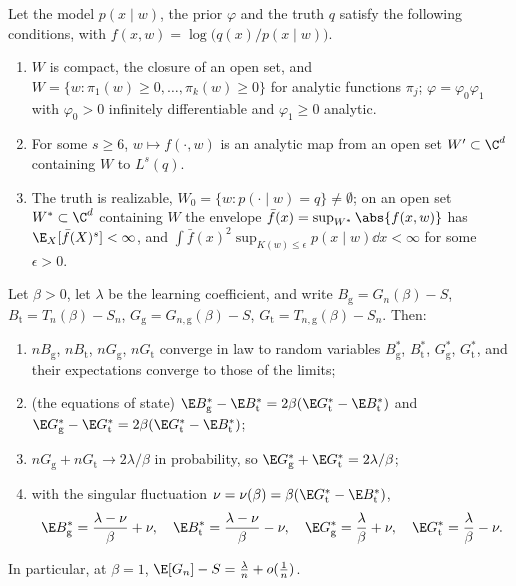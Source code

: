 \begin{refsection}
\begin{theorem}\label{thm:generalization:main}
Let the model $p(x\mid w)$, the prior $\varphi$ and the truth $q$ satisfy the following conditions, with $f(x,w)=\log\bigl(q(x)/p(x\mid w)\bigr)$.
\begin{enumerate}[label=(\roman*),nosep]
\item $W$ is compact, the closure of an open set, and $W=\{w:\pi_1(w)\ge0,\dots,\pi_k(w)\ge0\}$ for analytic functions $\pi_j$; $\varphi=\varphi_0\varphi_1$ with $\varphi_0>0$ infinitely differentiable and $\varphi_1\ge0$ analytic.
\item For some $s\ge6$, $w\mapsto f(\cdot,w)$ is an analytic map from an open set $W'\subset\C^d$ containing $W$ to $L^s(q)$.
\item The truth is realizable, $W_0=\{w:p(\cdot\mid w)=q\}\ne\emptyset$; on an open set $W^*\subset\C^d$ containing $W$ the envelope $\bar f(x)=\sup_{W^*}\abs{f(x,w)}$ has $\E_X[\bar f(X)^s]<\infty$, and $\int\bar f(x)^2\sup_{K(w)\le\epsilon}p(x\mid w)\dd x<\infty$ for some $\epsilon>0$.
\end{enumerate}
Let $\beta>0$, let $\lambda$ be the learning coefficient, and write $B_{\mathrm g}=G_n(\beta)-S$, $B_{\mathrm t}=T_n(\beta)-S_n$, $G_{\mathrm g}=G_{n,\mathrm g}(\beta)-S$, $G_{\mathrm t}=T_{n,\mathrm g}(\beta)-S_n$. Then:
\begin{enumerate}[label=(\alph*),nosep]
\item $nB_{\mathrm g}$, $nB_{\mathrm t}$, $nG_{\mathrm g}$, $nG_{\mathrm t}$ converge in law to random variables $B_{\mathrm g}^*$, $B_{\mathrm t}^*$, $G_{\mathrm g}^*$, $G_{\mathrm t}^*$, and their expectations converge to those of the limits;
\item (the equations of state) $\E B_{\mathrm g}^*-\E B_{\mathrm t}^*=2\beta(\E G_{\mathrm t}^*-\E B_{\mathrm t}^*)$ and $\E G_{\mathrm g}^*-\E G_{\mathrm t}^*=2\beta(\E G_{\mathrm t}^*-\E B_{\mathrm t}^*)$;
\item $nG_{\mathrm g}+nG_{\mathrm t}\to2\lambda/\beta$ in probability, so $\E G_{\mathrm g}^*+\E G_{\mathrm t}^*=2\lambda/\beta$;
\item with the singular fluctuation $\nu=\nu(\beta)=\beta(\E G_{\mathrm t}^*-\E B_{\mathrm t}^*)$,
\[
\E B_{\mathrm g}^*=\frac{\lambda-\nu}\beta+\nu,\quad\E B_{\mathrm t}^*=\frac{\lambda-\nu}\beta-\nu,\quad
\E G_{\mathrm g}^*=\frac\lambda\beta+\nu,\quad\E G_{\mathrm t}^*=\frac\lambda\beta-\nu .
\]
\end{enumerate}
In particular, at $\beta=1$, $\E[G_n]-S=\frac\lambda n+o(\frac1n)$.
\end{theorem}


\end{refsection}
